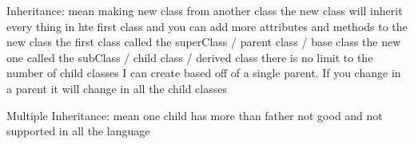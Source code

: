 Inheritance:
  mean making new class from another class 
  the new class will inherit every thing in hte first class 
  and you can add more attributes and methods to the new class
  the first class called the superClass / parent class / base class 
  the new one called the subClass  /  child class / derived class 
  there is no limit to the number of child classes I can create based off of a single parent.
  If you change in a parent it will change in all the child classes 


Multiple Inheritance:
  mean one child has more than father 
  not good and not supported in all the language 
